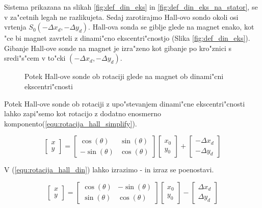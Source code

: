 Sistema prikazana na slikah \ref{fig:def_din_eks} in \ref{fig:def_din_eks_na_stator}, se v za"cetnih legah ne razlikujeta. Sedaj zarotirajmo Hall-ovo sondo okoli osi vrtenja $S_0(-\Delta x_d,-\Delta y_d)$. Hall-ova sonda se giblje glede na magnet enako, kot "ce bi magnet zavrteli z dinami"cno ekscentri"cnostjo (Slika \ref{fig:def_din_eks}). Gibanje Hall-ove sonde na magnet je izra"zeno kot gibanje po kro"znici s sredi"s"cem v to"cki $(-\Delta x_d,-\Delta y_d)$.

\begin{figure}[h!]
	\centering
	\caption{Potek Hall-ove sonde ob rotaciji glede na magnet ob dinami"cni ekscentri"cnosti}
	\label{fig:potek_sonde_din_eks}
\end{figure}

Potek Hall-ove sonde ob rotaciji z upo"stevanjem dinami"cne ekscentri"cnosti lahko zapi"semo kot rotacijo z dodatno enosmerno komponento(\ref{equ:rotacija_hall_simplify}).

\begin{equation}
\label{equ:rotacija_hall_din}
\begin{bmatrix} x\\y \end{bmatrix}=
\begin{bmatrix} \cos(\theta)&\sin(\theta)\\-\sin(\theta)&\cos(\theta) \end{bmatrix}
\begin{bmatrix} x_0\\y_0 \end{bmatrix}
+
\begin{bmatrix} -\Delta x_d\\-\Delta y_d \end{bmatrix}
\end{equation}

V (\ref{equ:rotacija_hall_din}) lahko izrazimo - in izraz se poenostavi.

\begin{equation}
\label{equ:rotacija_hall_din_simplify}
\begin{bmatrix} x\\y \end{bmatrix}=
\begin{bmatrix} \cos(\theta)&-\sin(\theta)\\\sin(\theta)&\cos(\theta) \end{bmatrix}
\begin{bmatrix} x_0\\y_0 \end{bmatrix}
-
\begin{bmatrix} \Delta x_d\\\Delta y_d \end{bmatrix}
\end{equation}

